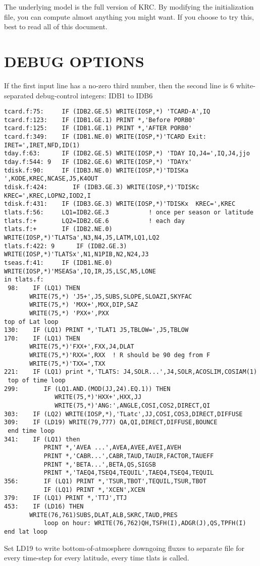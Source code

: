 \documentclass[draft]{article}  %
\begin{document}
The underlying model is the full version of KRC. By modifying the initialization
file, you can compute almost anything you might want. If you choose to try this,
best to read all of this document.

\section{ DEBUG OPTIONS \label{debug}}
If the first input line has a no-zero third number, then the second line is 6 
white-separated debug-control integers: IDB1 to IDB6
\vspace{-3.mm} 
\begin{verbatim}
tcard.f:75:     IF (IDB2.GE.5) WRITE(IOSP,*) 'TCARD-A',IQ
tcard.f:123:    IF (IDB1.GE.1) PRINT *,'Before PORB0'
tcard.f:125:    IF (IDB1.GE.1) PRINT *,'AFTER PORB0'
tcard.f:349:    IF (IDB1.NE.0) WRITE(IOSP,*)'TCARD Exit: IRET=',IRET,NFD,ID(1) 
tday.f:63:      IF (IDB2.GE.5) WRITE(IOSP,*) 'TDAY IQ,J4=',IQ,J4,jjo
tday.f:544: 9   IF (IDB2.GE.6) WRITE(IOSP,*) 'TDAYx'
tdisk.f:90:     IF (IDB3.NE.0) WRITE(IOSP,*)'TDISKa ',KODE,KREC,NCASE,J5,K4OUT
tdisk.f:424:       IF (IDB3.GE.3) WRITE(IOSP,*)'TDISKc  KREC=',KREC,LOPN2,IOD2,I
tdisk.f:431:    IF (IDB3.GE.3) WRITE(IOSP,*)'TDISKx  KREC=',KREC
tlats.f:56:     LQ1=IDB2.GE.3           ! once per season or latitude
tlats.f:+       LQ2=IDB2.GE.6           ! each day
tlats.f:+       IF (IDB2.NE.0) WRITE(IOSP,*)'TLATSa',N3,N4,J5,LATM,LQ1,LQ2
tlats.f:422: 9      IF (IDB2.GE.3) WRITE(IOSP,*)'TLATSx',N1,N1PIB,N2,N24,J3
tseas.f:41:     IF (IDB1.NE.0) WRITE(IOSP,*)'MSEASa',IQ,IR,J5,LSC,N5,LONE
in tlats.f:
 98:	IF (LQ1) THEN
	   WRITE(75,*) 'J5+',J5,SUBS,SLOPE,SLOAZI,SKYFAC
	   WRITE(75,*) 'MXX+',MXX,DIP,SAZ
	   WRITE(75,*) 'PXX+',PXX
top of Lat loop
130:    IF (LQ1) PRINT *,'TLAT1 J5,TBLOW=',J5,TBLOW
170:	IF (LQ1) THEN
	   WRITE(75,*)'FXX+',FXX,J4,DLAT
	   WRITE(75,*)'RXX=',RXX  ! R should be 90 deg from F
	   WRITE(75,*)'TXX=',TXX
221:    IF (LQ1) print *,'TLATS: J4,SOLR...',J4,SOLR,ACOSLIM,COSIAM(1)
 top of time loop
299:	   IF (LQ1.AND.(MOD(JJ,24).EQ.1)) THEN
     	      WRITE(75,*)'HXX+',HXX,JJ
              WRITE(75,*)'ANG:',ANGLE,COSI,COS2,DIRECT,QI
303:    IF (LQ2) WRITE(IOSP,*),'TLatc',JJ,COSI,COS3,DIRECT,DIFFUSE 
309:    IF (LD19) WRITE(79,777) QA,QI,DIRECT,DIFFUSE,BOUNCE
 end time loop
341:    IF (LQ1) then 
           PRINT *,'AVEA ...',AVEA,AVEE,AVEI,AVEH
           PRINT *,'CABR...',CABR,TAUD,TAUIR,FACTOR,TAUEFF
           PRINT *,'BETA...',BETA,QS,SIGSB 
           PRINT *,'TAEQ4,TSEQ4,TEQUIL',TAEQ4,TSEQ4,TEQUIL
356:       IF (LQ1) PRINT *,'TSUR,TBOT',TEQUIL,TSUR,TBOT
           IF (LQ1) PRINT *,'XCEN',XCEN 
379:    IF (LQ1) PRINT *,'TTJ',TTJ
453:    IF (LD16) THEN
	   WRITE(76,761)SUBS,DLAT,ALB,SKRC,TAUD,PRES
           loop on hour: WRITE(76,762)QH,TSFH(I),ADGR(J),QS,TPFH(I)
end lat loop
\end{verbatim}
Set LD19 to write bottom-of-atmosphere downgoing fluxes to separate file
for every time-step for every latitude, every time tlats is called.
 
\end{document}

